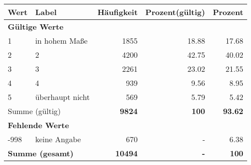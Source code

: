      \begin{longtable}{lXrrr}
     \toprule
     \textbf{Wert} & \textbf{Label} & \textbf{Häufigkeit} & \textbf{Prozent(gültig)} & \textbf{Prozent} \\
     \endhead
     \midrule
     \multicolumn{5}{l}{\textbf{Gültige Werte}}\\

     1 &
     \multicolumn{1}{X}{ in hohem Maße   } &


       \num{1855} &
       \num[round-mode=places,round-precision=2]{18,88} &
         \num[round-mode=places,round-precision=2]{17,68} \\

     2 &
     \multicolumn{1}{X}{ 2   } &


       \num{4200} &
       \num[round-mode=places,round-precision=2]{42,75} &
         \num[round-mode=places,round-precision=2]{40,02} \\

     3 &
     \multicolumn{1}{X}{ 3   } &


       \num{2261} &
       \num[round-mode=places,round-precision=2]{23,02} &
         \num[round-mode=places,round-precision=2]{21,55} \\

     4 &
     \multicolumn{1}{X}{ 4   } &


       \num{939} &
       \num[round-mode=places,round-precision=2]{9,56} &
         \num[round-mode=places,round-precision=2]{8,95} \\

     5 &
     \multicolumn{1}{X}{ überhaupt nicht   } &


       \num{569} &
       \num[round-mode=places,round-precision=2]{5,79} &
         \num[round-mode=places,round-precision=2]{5,42} \\
     \midrule
     \multicolumn{2}{l}{Summe (gültig)} &
       \textbf{\num{9824}} &
     \textbf{100} &
       \textbf{\num[round-mode=places,round-precision=2]{93,62}} \\
     \multicolumn{5}{l}{\textbf{Fehlende Werte}}\\
       -998 &
       keine Angabe &
         \num{670} &
        - &
         \num[round-mode=places,round-precision=2]{6,38} \\
     \midrule
     \multicolumn{2}{l}{\textbf{Summe (gesamt)}} &
          \textbf{\num{10494}} &
        \textbf{-} &
        \textbf{100} \\
     \bottomrule
     \end{longtable}
     
